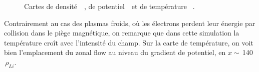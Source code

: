 \begin{refsection}
	\begin{figure}[!htbp]
    \centering
    \caption{Cartes de densité~~, de
    potentiel~~et de température
   ~.}
    \label{2-CartesWithTeFiltre}
	\end{figure}
	
Contrairement au cas des plasmas froids, où les électrons perdent leur énergie
par collision dans le piège magnétique, on
remarque que dans cette simulation la température croît avec
l'intensité du champ. Sur la carte de température, on voit bien l'emplacement du
zonal flow au niveau du gradient de potentiel, en $x\sim\,$140$\,\rho_{Li}$.
	

\end{refsection}
